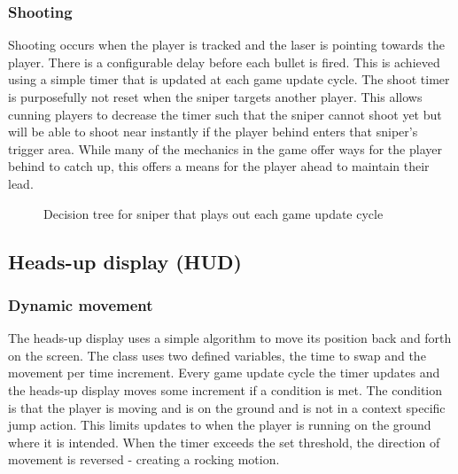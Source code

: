 \documentclass[11pt,a4paper]{article}
\begin{document}
\subsubsection{Shooting}
Shooting occurs when the player is tracked and the laser is pointing towards the player. There is a configurable delay before each bullet is fired. This is achieved using a simple timer that is updated at each game update cycle. The shoot timer is purposefully not reset when the sniper targets another player. This allows cunning players to decrease the timer such that the sniper cannot shoot yet but will be able to shoot near instantly if the player behind enters that sniper's trigger area. While many of the mechanics in the game offer ways for the player behind to catch up, this offers a means for the player ahead to maintain their lead.
\begin{figure}[H]
    \caption{Decision tree for sniper that plays out each game update cycle}
    \label{fig:sniperDecisionTree}
\end{figure}
\subsection{Heads-up display (HUD)}
\subsubsection{Dynamic movement}
\label{sss:dynamic_movement}
The heads-up display uses a simple algorithm to move its position back and forth on the screen. The class uses two defined variables, the time to swap and the movement per time increment. Every game update cycle the timer updates and the heads-up display moves some increment if a condition is met. The condition is that the player is moving and is on the ground and is not in a context specific jump action. This limits updates to when the player is running on the ground where it is intended. When the timer exceeds the set threshold, the direction of movement is reversed - creating a rocking motion.
\end{document}
